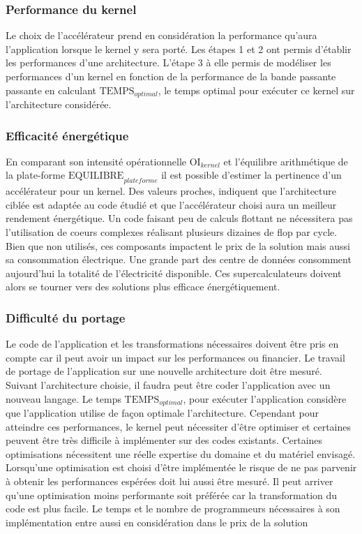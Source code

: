 \subsubsection{Performance du kernel}
Le choix de l'accélérateur prend en considération la performance qu'aura l'application lorsque le kernel y sera porté. Les étapes 1 et 2 ont permis d'établir les performances d'une architecture. L'étape 3 à elle permis de modéliser les performances d'un kernel en fonction de la performance de la bande passante passante en calculant $\text{TEMPS}_{optimal}$, le temps optimal pour exécuter ce kernel sur l'architecture considérée.

\subsubsection{Efficacité énergétique}
En comparant son intensité opérationnelle  $\text{OI}_{kernel}$ et l'équilibre arithmétique de la plate-forme $\text{EQUILIBRE}_{plateforme}$ il est possible d'estimer la pertinence d'un accélérateur pour un kernel. Des valeurs proches, indiquent que l'architecture ciblée est adaptée au code étudié et que l'accélérateur choisi aura un meilleur rendement énergétique. Un code faisant peu de calculs flottant ne nécessitera pas l'utilisation de coeurs complexes réalisant plusieurs dizaines de flop par cycle. Bien que non utilisés, ces composants impactent le prix de la solution mais aussi sa consommation électrique. Une grande part des centre de données consomment aujourd'hui la totalité de l'électricité disponible. Ces supercalculateurs doivent alors se tourner vers des solutions plus efficace énergétiquement.


\subsubsection{Difficulté du portage}
Le code de l'application  et les transformations nécessaires doivent être pris en compte car il peut avoir un impact sur les performances ou financier. Le travail de portage de l'application sur une nouvelle architecture doit être mesuré. Suivant l'architecture choisie, il faudra peut être coder l'application avec un nouveau langage. Le temps $\text{TEMPS}_{optimal}$, pour exécuter l'application considère que l'application utilise de façon optimale l'architecture. Cependant pour atteindre ces performances, le kernel peut nécessiter d'être optimiser et certaines peuvent être très difficile à implémenter sur des codes existants. Certaines optimisations nécessitent une réelle expertise du domaine et du matériel envisagé. Lorsqu'une optimisation est choisi d'être implémentée le risque de ne pas parvenir à obtenir les performances espérées doit lui aussi être mesuré. Il peut arriver qu'une optimisation moins performante soit préférée car la transformation du code est plus facile. Le temps et le nombre de programmeurs nécessaires à son implémentation entre aussi en considération dans le prix de la solution


